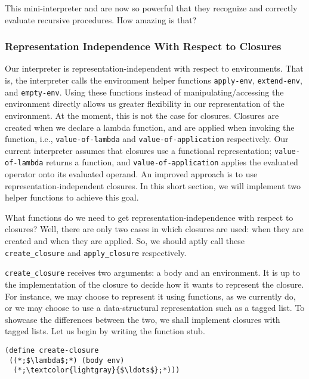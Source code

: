 This mini-interpreter and  are now so powerful that they recognize and correctly evaluate recursive procedures. How amazing is that?

\subsubsection*{Representation Independence With Respect to Closures}

Our interpreter is representation-independent with respect to environments. That is, the interpreter calls the environment helper functions \texttt{apply-env}, \texttt{extend-env}, and \texttt{empty-env}. Using these functions instead of manipulating/accessing the environment directly allows us greater flexibility in our representation of the environment. At the moment, this is not the case for closures. Closures are created when we declare a lambda function, and are applied when invoking the function, i.e., \texttt{value-of-lambda} and \texttt{value-of-application} respectively. Our current interpreter assumes that closures use a functional representation; \texttt{value-of-lambda} returns a function, and \texttt{value-of-application} applies the evaluated operator onto its evaluated operand. An improved approach is to use representation-independent closures. In this short section, we will implement two helper functions to achieve this goal.

What functions do we need to get representation-independence with respect to closures? Well, there are only two cases in which closures are used: when they are created and when they are applied. So, we should aptly call these \texttt{create\_closure} and \texttt{apply\_closure} respectively. 

\texttt{create\_closure} receives two arguments: a body and an environment. It is up to the implementation of the closure to decide how it wants to represent the closure. For instance, we may choose to represent it using functions, as we currently do, or we may choose to use a data-structural representation such as a tagged list. To showcase the differences between the two, we shall implement closures with tagged lists. Let us begin by writing the function stub.

\begin{cl}[]{}\begin{lstlisting}[language=MyScheme]
(define create-closure
 ((*;$\lambda$;*) (body env)
  (*;\textcolor{lightgray}{$\ldots$};*)))
\end{lstlisting}\end{cl}

